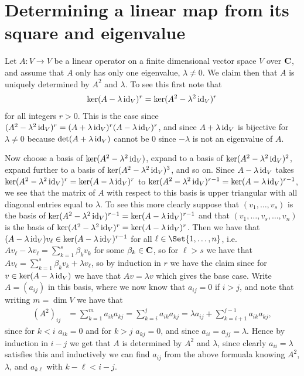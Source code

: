 \section{Determining a linear map from its square and eigenvalue}\label{sec:linearmapfromsquare}

Let $A\colon V\to V$ be a linear operator on a finite dimensional vector space $V$ over $\mathbf{C}$, and assume that $A$ only has only one eigenvalue, $\lambda\neq 0$. We claim then that $A$ is uniquely determined by $A^2$ and $\lambda$. To see this first note that
\begin{align*}
  \ker(A-\lambda \operatorname{id}_V)^r = \ker(A^2-\lambda^2\operatorname{id}_V)^r
\end{align*}
for all integers $r>0$. This is the case since $(A^2-\lambda^2\operatorname{id}_V)^r = (A+\lambda\operatorname{id}_V)^r(A-\lambda\operatorname{id}_V)^r$, and since $A+\lambda\operatorname{id}_V$ is bijective for $\lambda\neq 0$ because $\det(A+\lambda\operatorname{id}_V)$ cannot be $0$ since $-\lambda$ is not an eigenvalue of $A$.

Now choose a basis of $\ker(A^2-\lambda^2\operatorname{id}_V)$, expand to a basis of $\ker(A^2-\lambda^2\operatorname{id}_V)^2$, expand further to a basis of $\ker(A^2-\lambda^2\operatorname{id}_V)^3$, and so on. Since $A-\lambda\operatorname{id}_V$ takes $\ker(A^2-\lambda^2\operatorname{id}_V)^r=\ker(A-\lambda\operatorname{id}_V)^r$ to $\ker(A^2-\lambda^2\operatorname{id}_V)^{r-1}=\ker(A-\lambda\operatorname{id}_V)^{r-1}$, we see that the matrix of $A$ with respect to this basis is upper triangular with all diagonal entries equal to $\lambda$. To see this more clearly suppose that $(v_1,\dotsc,v_s)$ is the basis of $\ker(A^2-\lambda^2\operatorname{id}_V)^{r-1}=\ker(A-\lambda\operatorname{id}_V)^{r-1}$ and that $(v_1,\dotsc,v_s,\dotsc,v_n)$ is the basis of $\ker(A^2-\lambda^2\operatorname{id}_V)^r = \ker(A-\lambda\operatorname{id}_V)^r$. Then we have that $(A-\lambda\operatorname{id}_V)v_\ell \in \ker(A-\lambda\operatorname{id}_V)^{r-1}$ for all $\ell\in\Set{1,\dotsc,n}$, i.e. $Av_\ell - \lambda v_\ell = \sum_{k=1}^s \beta_k v_k$ for some $\beta_k\in\mathbf{C}$, so for $\ell>s$ we have that $Av_\ell = \sum_{k=1}^s \beta_k v_k + \lambda v_\ell$, so by induction in $r$ we have the claim since for $v\in \ker(A-\lambda\operatorname{id}_V)$ we have that $Av = \lambda v$ which gives the base case. Write $A=(a_{ij})$ in this basis, where we now know that $a_{ij}=0$ if $i>j$, and note that writing $m=\dim V$ we have that
\begin{align*}
  (A^2)_{ij} &= \sum_{k=1}^m a_{ik}a_{kj} = \sum_{k=i}^j a_{ik}a_{kj} = \lambda a_{ij} + \sum_{k=i+1}^{j-1} a_{ik}a_{kj},
\end{align*}
since for $k<i$ $a_{ik}=0$ and for $k>j$ $a_{kj}=0$, and since $a_{ii}=a_{jj}=\lambda$. Hence by induction in $i-j$ we get that $A$ is determined by $A^2$ and $\lambda$, since clearly $a_{ii}=\lambda$ satisfies this and inductively we can find $a_{ij}$ from the above formuala knowing $A^2$, $\lambda$, and $a_{k\ell}$ with $k-\ell<i-j$.


